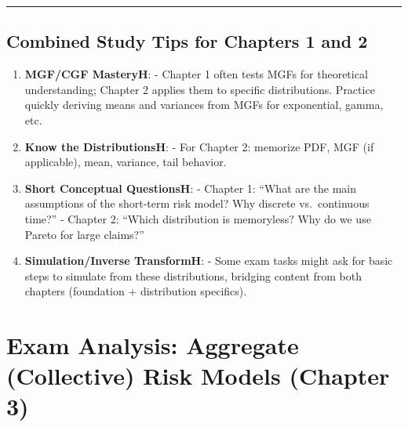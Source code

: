 \documentclass[13pt,a4paper]{article}
\begin{document}
\vspace{1em}
\hrule
\vspace{1em}

\subsection{Combined Study Tips for Chapters 1 and 2}
\begin{enumerate}
  \item \textbf{MGF/CGF MasteryH}:
    - Chapter 1 often tests MGFs for theoretical understanding; Chapter 2 applies them to specific distributions. Practice quickly deriving means and variances from MGFs for exponential, gamma, etc.
  \item \textbf{Know the DistributionsH}:
    - For Chapter 2: memorize PDF, MGF (if applicable), mean, variance, tail behavior. 
  \item \textbf{Short Conceptual QuestionsH}:
    - Chapter 1: “What are the main assumptions of the short-term risk model? Why discrete vs.\ continuous time?”  
    - Chapter 2: “Which distribution is memoryless? Why do we use Pareto for large claims?”  
  \item \textbf{Simulation/Inverse TransformH}:
    - Some exam tasks might ask for basic steps to simulate from these distributions, bridging content from both chapters (foundation + distribution specifics).
\end{enumerate}

\section{Exam Analysis: Aggregate (Collective) Risk Models (Chapter 3)}
\label{sec:agg_risk_exam_analysis}
\end{document}

